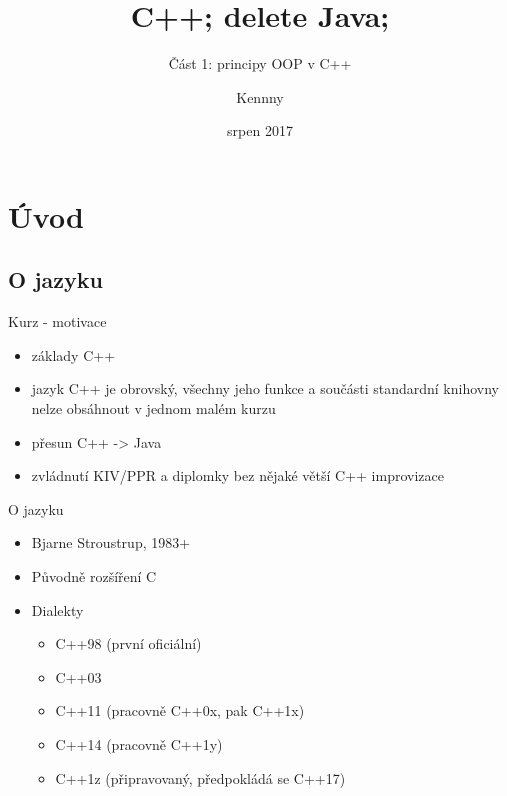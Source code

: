 \documentclass{beamer}
\begin{document}
\title{C++; delete Java;}
\subtitle{Část 1: principy OOP v C++}
\author{Kennny}
\date{srpen 2017}

\frame{\titlepage}


\newenvironment{xframe}[1][]
  {\begin{frame}[fragile,environment=xframe,#1]}
  {\end{frame}}

\begin{comment}
\begin{xframe}{tttt}
	\begin{itemize}
		\item
	\end{itemize}
\end{xframe}
\end{comment}



\section{Úvod}
\subsection{O jazyku}


\begin{xframe}{Kurz - motivace}
	\begin{itemize}
		\item základy C++
		\item jazyk C++ je obrovský, všechny jeho funkce a součásti standardní knihovny nelze obsáhnout v jednom malém kurzu
		\item přesun C++ -> Java
		\item zvládnutí KIV/PPR a diplomky bez nějaké větší C++ improvizace
	\end{itemize}
\end{xframe}


\begin{xframe}{O jazyku}
	\begin{itemize}
		\item Bjarne Stroustrup, 1983+
		\item Původně rozšíření C
		\item Dialekty\begin{itemize}
			\item C++98 (první oficiální)
			\item C++03
			\item C++11 (pracovně C++0x, pak C++1x)
			\item C++14 (pracovně C++1y)
			\item C++1z (připravovaný, předpokládá se C++17)
			\end{itemize}
	\end{itemize}
\end{xframe}
\end{document}
